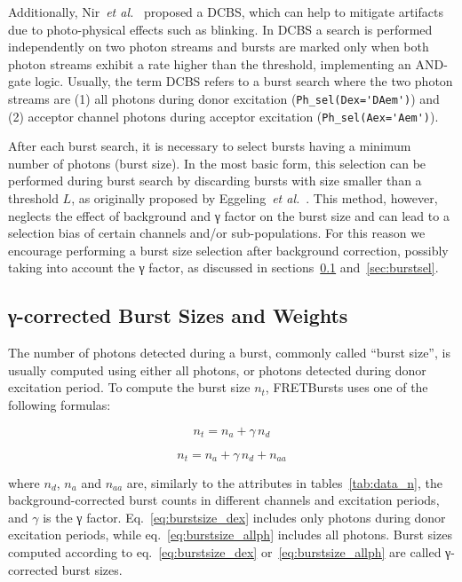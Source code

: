 Additionally, Nir~\textit{et al.}~\cite{Nir_2006} proposed a DCBS, which can help 
to mitigate artifacts due to photo-physical effects such as blinking. 
In DCBS a search is performed independently on two photon streams 
and bursts are marked only when both photon streams exhibit a rate higher than 
the threshold, implementing an AND-gate logic.
Usually, the term DCBS refers to a burst search where the two photon streams
are (1) all photons
during donor excitation (\verb|Ph_sel(Dex='DAem')|) and (2) acceptor channel photons
during acceptor
excitation (\verb|Ph_sel(Aex='Aem')|).

After each burst search, it is necessary to select
bursts having a minimum number of photons (burst size). In the most
basic form, this selection can be performed during burst search by discarding
bursts with size smaller than a threshold $L$, as originally proposed by
Eggeling~\textit{et al.}~\cite{Eggeling_1998}.
This method, however, neglects the effect
of background and γ factor on the burst size and can lead to a selection
bias of certain channels and/or sub-populations.
For this reason we encourage performing a burst size selection after background
correction, possibly taking into account the γ factor, as discussed in
sections~\ref{sec:burstsizeweights} and~\ref{sec:burstsel}.

\subsection{γ-corrected Burst Sizes and Weights}
\label{sec:burstsizeweights}

The number of photons detected during a burst, commonly called ``burst size'',
is usually computed using either all photons, or photons detected 
during donor excitation period. To compute the burst size $n_t$, FRETBursts uses 
one of the following formulas:

\begin{equation}
\label{eq:burstsize_dex}
n_t = n_a + \gamma\,n_d 
\end{equation}

\begin{equation}
\label{eq:burstsize_allph}
n_t = n_a + \gamma\,n_d + n_{aa}
\end{equation}

\noindent where $n_d$, $n_a$ and $n_{aa}$ are, similarly to the attributes 
in tables~\ref{tab:data_n}, the background-corrected
burst counts in different channels and excitation periods,
and $\gamma$ is the γ factor.
Eq.~\ref{eq:burstsize_dex} includes  only photons during donor excitation periods, 
while eq.~\ref{eq:burstsize_allph} includes all photons.
Burst sizes computed according to eq.~\ref{eq:burstsize_dex} 
or~\ref{eq:burstsize_allph} are called γ-corrected burst sizes.

